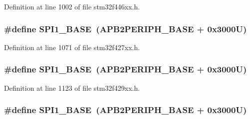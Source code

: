 Definition at line 1002 of file stm32f446xx.\+h.

\subsubsection[{\texorpdfstring{S\+P\+I1\+\_\+\+B\+A\+SE}{SPI1_BASE}}]{\setlength{\rightskip}{0pt plus 5cm}\#define S\+P\+I1\+\_\+\+B\+A\+SE~({\bf A\+P\+B2\+P\+E\+R\+I\+P\+H\+\_\+\+B\+A\+SE} + 0x3000\+U)}\hypertarget{group___peripheral__memory__map_ga50cd8b47929f18b05efbd0f41253bf8d}{}\label{group___peripheral__memory__map_ga50cd8b47929f18b05efbd0f41253bf8d}


Definition at line 1071 of file stm32f427xx.\+h.

\subsubsection[{\texorpdfstring{S\+P\+I1\+\_\+\+B\+A\+SE}{SPI1_BASE}}]{\setlength{\rightskip}{0pt plus 5cm}\#define S\+P\+I1\+\_\+\+B\+A\+SE~({\bf A\+P\+B2\+P\+E\+R\+I\+P\+H\+\_\+\+B\+A\+SE} + 0x3000\+U)}\hypertarget{group___peripheral__memory__map_ga50cd8b47929f18b05efbd0f41253bf8d}{}\label{group___peripheral__memory__map_ga50cd8b47929f18b05efbd0f41253bf8d}


Definition at line 1123 of file stm32f429xx.\+h.

\subsubsection[{\texorpdfstring{S\+P\+I1\+\_\+\+B\+A\+SE}{SPI1_BASE}}]{\setlength{\rightskip}{0pt plus 5cm}\#define S\+P\+I1\+\_\+\+B\+A\+SE~({\bf A\+P\+B2\+P\+E\+R\+I\+P\+H\+\_\+\+B\+A\+SE} + 0x3000\+U)}\hypertarget{group___peripheral__memory__map_ga50cd8b47929f18b05efbd0f41253bf8d}{}\label{group___peripheral__memory__map_ga50cd8b47929f18b05efbd0f41253bf8d}


